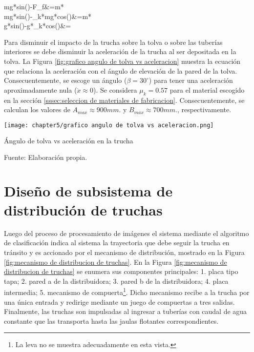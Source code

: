 \begin{myequation}\label{eq:calculo de angulo de la tolva2}
	\begin{split}
		mg*sin(\beta)-F_{f}&=m* \\
		mg*sin(\beta)-\mu_{k}*mg*cos(\beta)&=m* \\
		g*sin(\beta)-g*\mu_{k}*cos(\beta)&=
	\end{split}
\end{myequation}

Para disminuir el impacto de la trucha sobre la tolva o sobre las tuberías interiores se debe disminuir la aceleración de la trucha al ser depositada en la tolva. La Figura \ref{fig:grafico angulo de tolva vs aceleracion} muestra la ecuación que relaciona la aceleración con el ángulo de elevación de la pared de la tolva. Consecuentemente, se escoge un ángulo ($\beta=30^\circ$) para tener una aceleración aproximadamente nula ($\ddot{x}\approx0$). Se considera $\mu_{k}=0.57$ para el material escogido en la sección \ref{sssec:seleccion de materiales de fabricacion}. Consecuentemente, se calculan los valores de $A_{max}\approx{900} mm.$ y $B_{max}\approx{700} mm.$, respectivamente.


\begin{myfigure}[H]
	\footnotesize\centering
	\texttt{[image: chapter5/grafico angulo de tolva vs aceleracion.png]}
	\caption{Ángulo de tolva vs aceleración en la trucha}
	\begin{myflushcenter}
		Fuente: Elaboración propia.
	\end{myflushcenter}
	\label{fig:grafico angulo de tolva vs aceleracion}
\end{myfigure}

\section{Diseño de subsistema de distribución de truchas}

Luego del proceso de procesamiento de imágenes el sistema mediante el algoritmo de clasificación indica al sistema la trayectoria que debe seguir la trucha en tránsito y es accionado por el mecanismo de distribución, mostrado en la Figura \ref{fig:mecanismo de distribucion de truchas}. En la Figura \ref{fig:mecanismo de distribucion de truchas} se enumera sus componentes principales: 1. placa tipo tapa; 2. pared a de la distribuidora; 3. pared b de la distribuidora; 4. placa intermedia; 5. mecanismo de compuerta\footnote{La leva no se muestra adecuadamente en esta vista.}. Dicho mecanismo recibe a la trucha por una única entrada y redirige mediante un juego de compuertas a tres salidas. Finalmente, las truchas son impulsadas al ingresar a tuberías con caudal de agua constante que las transporta hasta las jaulas flotantes correspondientes.

